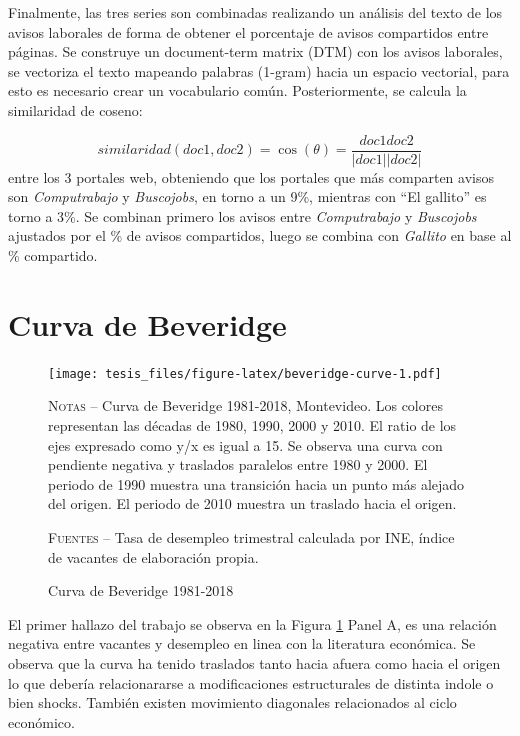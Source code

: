 \documentclass[12pt,oneside]{reedthesis}
\begin{document}
Finalmente, las tres series son combinadas realizando un análisis del texto de los avisos laborales de forma de obtener el porcentaje de avisos compartidos entre páginas. Se construye un document-term matrix (DTM) con los avisos laborales, se vectoriza el texto mapeando palabras (1-gram) hacia un espacio vectorial, para esto es necesario crear un vocabulario común. Posteriormente, se calcula la similaridad de coseno:

\[
similaridad(doc1, doc2) = \cos(\theta) = \frac{doc1doc2}{|doc1||doc2|}
\]
entre los 3 portales web, obteniendo que los portales que más comparten avisos son \emph{Computrabajo} y \emph{Buscojobs}, en torno a un 9\%, mientras con ``El gallito'' es torno a 3\%. Se combinan primero los avisos entre \emph{Computrabajo} y \emph{Buscojobs} ajustados por el \% de avisos compartidos, luego se combina con \emph{Gallito} en base al \% compartido.

\hypertarget{curva-de-beveridge}{%
\section{Curva de Beveridge}\label{curva-de-beveridge}}
\begin{figure}
\texttt{[image: tesis\_files/figure-latex/beveridge-curve-1.pdf]}
\caption{Curva de Beveridge 1981-2018}\label{fig:beveridge-curve}\textsc{}

\footnotesize\textsc{Notas} -- Curva de Beveridge 1981-2018, Montevideo. Los colores representan las décadas de 1980, 1990, 2000 y 2010. El ratio de los ejes expresado como y/x es igual a 15. Se observa una curva con pendiente negativa y traslados paralelos entre 1980 y 2000. El periodo de 1990 muestra una transición hacia un punto más alejado del origen. El periodo de 2010 muestra un traslado hacia el origen.

\textsc{Fuentes} -- Tasa de desempleo trimestral calculada por INE, índice de vacantes de elaboración propia.
\end{figure}
El primer hallazo del trabajo se observa en la Figura \ref{fig:beveridge-curve} Panel A, es una relación negativa entre vacantes y desempleo en linea con la literatura económica. Se observa que la curva ha tenido traslados tanto hacia afuera como hacia el origen lo que debería relacionararse a modificaciones estructurales de distinta indole o bien shocks. También existen movimiento diagonales relacionados al ciclo económico.
\end{document}
